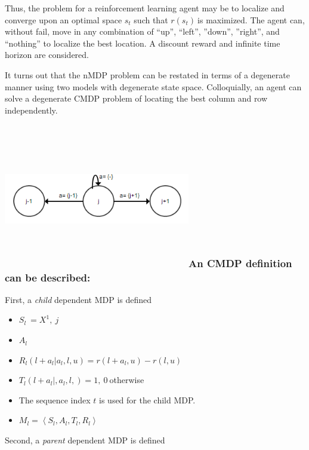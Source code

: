 \documentclass[]{article}
\begin{document}
Thus, the problem for a reinforcement learning agent may be to localize
and converge upon an optimal space \(s_{t}\) such that \(r(s_{t})\ \)is
maximized. The agent can, without fail, move in any combination of
``up'', ``left'', ''down'', ''right'', and ``nothing'' to localize the
best location. A discount reward and infinite time horizon are
considered.

It turns out that the nMDP problem can be restated in terms of a
degenerate manner using two models with degenerate state space.
Colloquially, an agent can solve a degenerate CMDP problem of locating
the best column and row independently.

\subsubsection[An CMDP definition can be
described:]{\texorpdfstring{\protect\includegraphics[width=3.20833in,height=2.40000in]{media/image3.png}An
CMDP definition can be
described:}{An CMDP definition can be described:}}\label{an-cmdp-definition-can-be-described}

First, a \emph{child} dependent MDP is defined

\begin{itemize}
\item
  \(S_{l}\  = X^{1},\ j\)
\item
  \(A_{l}\)
\item
  \(R_{l}\left( l + a_{l}|a_{l},l,u \right) = r\left( l + a_{l},u \right) - r(l,u)\)
\item
  \(T_{l}\left( l + a_{l}|,a_{l},l, \right) = 1,\ 0\ \)otherwise
\item
  The sequence index \(t\) is used for the child MDP.
\item
  \(M_{l} = \left\langle S_{l},A_{l},T_{l},R_{l} \right\rangle\)
\end{itemize}

Second, a \emph{parent} dependent MDP is defined
\end{document}
